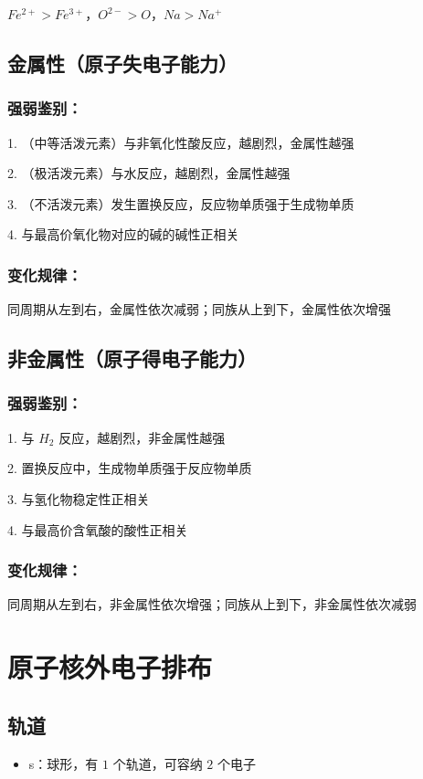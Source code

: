 \documentclass[UTF8,zihao=-4,openany]{ctexbook}
\begin{document}
$Fe^{2+}>Fe^{3+}$，$O^{2-}>O$，$Na>Na^+$\par
\subsection{金属性（原子失电子能力）}
\subsubsection{强弱鉴别：}
1. （中等活泼元素）与非氧化性酸反应，越剧烈，金属性越强\par

2. （极活泼元素）与水反应，越剧烈，金属性越强\par

3. （不活泼元素）发生置换反应，反应物单质强于生成物单质\par

4. 与最高价氧化物对应的碱的碱性正相关\par
\subsubsection{变化规律：}
同周期从左到右，金属性依次减弱；同族从上到下，金属性依次增强\par
\subsection{非金属性（原子得电子能力）}
\subsubsection{强弱鉴别：}
1.  与 $H_2$ 反应，越剧烈，非金属性越强\par

2.  置换反应中，生成物单质强于反应物单质\par

3.  与氢化物稳定性正相关\par

4.  与最高价含氧酸的酸性正相关\par
\subsubsection{变化规律：}
同周期从左到右，非金属性依次增强；同族从上到下，非金属性依次减弱\par
\section{原子核外电子排布}
\subsection{轨道}
\begin{itemize}
\item s：球形，有 $1$ 个轨道，可容纳 $2$ 个电子
\end{itemize}
\end{document}
